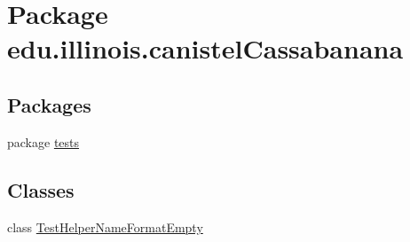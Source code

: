 \hypertarget{namespaceedu_1_1illinois_1_1canistelCassabanana}{
\section{Package edu.illinois.canistelCassabanana}
\label{namespaceedu_1_1illinois_1_1canistelCassabanana}
}
\subsection*{Packages}
\begin{DoxyCompactItemize}
\item 
package \hyperlink{namespaceedu_1_1illinois_1_1canistelCassabanana_1_1tests}{tests}
\end{DoxyCompactItemize}
\subsection*{Classes}
\begin{DoxyCompactItemize}
\item 
class \hyperlink{classedu_1_1illinois_1_1canistelCassabanana_1_1TestHelperNameFormatEmpty}{TestHelperNameFormatEmpty}
\end{DoxyCompactItemize}
